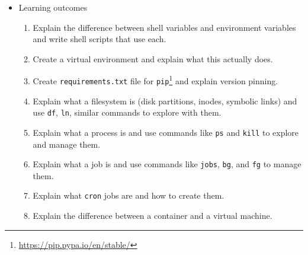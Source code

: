 \documentclass[krantzl]{krantz}
\newcommand{\hreffoot}[2]{{#1}\footnote{\href{#2}{#2}}}
\begin{document}
\begin{itemize}
\begin{itemize}
\begin{itemize}
\end{itemize}


\item Python for command-line scripting\begin{itemize}
\item variables; numbers and strings; lists; dictionaries; \texttt{for} and \texttt{while} loops;
\texttt{if}/\texttt{else}; \texttt{with}; defining and calling functions; \texttt{sys.argv}, \texttt{sys.stdin},
and \texttt{sys.stdout}; simple regular expressions; reading JSON data;
reading CSV files using \hreffoot{Pandas}{https://pandas.pydata.org/} or \hreffoot{Polars}{https://pola.rs/}

\item \texttt{pip install}

\end{itemize}


\item \texttt{python -m venv} or \texttt{conda create}

\end{itemize}


\item Learning outcomes\begin{enumerate}
\item Explain the difference between shell variables and environment variables
    and write shell scripts that use each.

\item Create a virtual environment and explain what this actually does.

\item Create \texttt{requirements.txt} file for \hreffoot{\texttt{pip}}{https://pip.pypa.io/en/stable/} and explain version pinning.

\item Explain what a filesystem is (disk partitions, inodes, symbolic links)
    and use \texttt{df}, \texttt{ln}, similar commands to explore with them.

\item Explain what a process is and use commands like \texttt{ps} and \texttt{kill} to explore and manage them.

\item Explain what a job is and use commands like \texttt{jobs}, \texttt{bg}, and \texttt{fg} to manage them.

\item Explain what \texttt{cron} jobs are and how to create them.

\item Explain the difference between a container and a virtual machine.


\end{enumerate}
\end{itemize}
\end{document}
